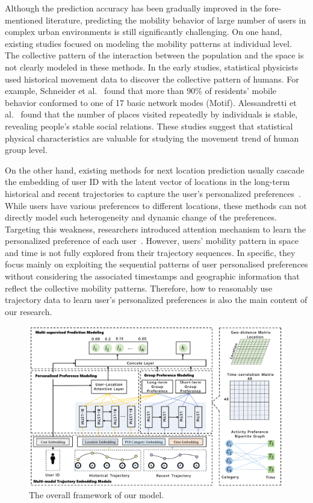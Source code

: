 \documentclass[10pt,journal,compsoc]{IEEEtran}
\begin{document}
Although the prediction accuracy has been gradually improved in the fore-mentioned literature, predicting the mobility behavior of large number of users in complex urban environments is still significantly challenging.
On one hand, existing studies focused on modeling the mobility patterns at individual level. The collective pattern of the interaction between the population and the space is not clearly modeled in these methods. In the early studies, statistical physicists used historical movement data to discover the collective pattern of humans. For example, Schneider et al.~\cite{schneider2013unravelling} found that more than 90\% of residents’ mobile behavior conformed to one of 17 basic network modes (Motif). Alessandretti et al.~\cite{alessandretti2018evidence} found that the number of places visited repeatedly by individuals is stable, revealing people’s stable social relations. These studies suggest that statistical physical characteristics are valuable for studying the movement trend of human group level. 


On the other hand, existing methods for next location prediction usually cascade the embedding of user ID with the latent vector of locations in the long-term historical and recent trajectories to capture the user's personalized preferences~\cite{guo2020attentional,lian2020geography,liang2020learning}. While users have various preferences to different locations, these methods can not directly model such heterogeneity and dynamic change of the preferences. Targeting this weakness, researchers introduced attention mechanism to learn the personalized preference of each user~\cite{wu2020personalized}. However, users' mobility pattern in space and time is not fully explored from their trajectory sequences. In specific, they focus mainly on exploiting the sequential patterns of user personalised preferences without considering the associated timestamps and geographic information that reflect the collective mobility patterns. Therefore, how to reasonably use trajectory data to learn user's personalized preferences is also the main content of our research.

\begin{figure}[htpb]
    \centering
    \includegraphics[width=15cm]{figure/network2.pdf}
    \caption{The overall framework of our model.}
    \label{fig.2}
\end{figure}
\end{document}
